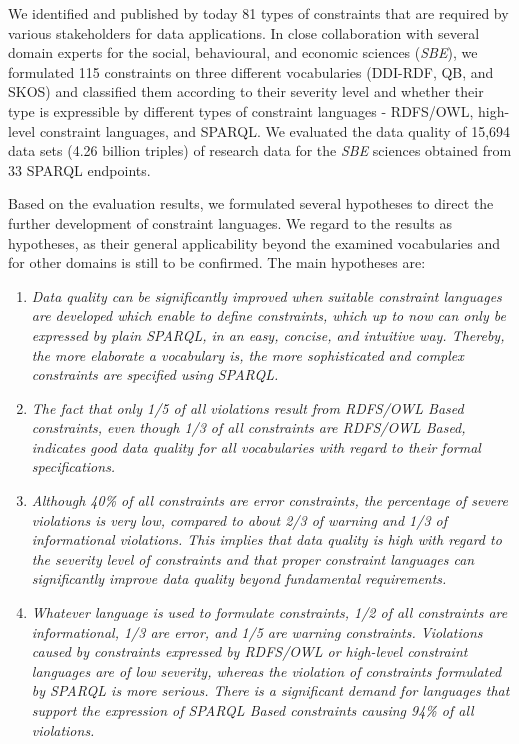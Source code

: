 \documentclass[conference]{IEEEtran}
\begin{document}
We identified and published by today 81 types of constraints  that are required by various stakeholders for data applications.
In close collaboration with several domain experts for the social, behavioural, and economic sciences (\emph{SBE}), we formulated 115 constraints on three different vocabularies (DDI-RDF, QB, and SKOS) and classified them according to their severity level and  whether their type is expressible by different types of constraint languages - RDFS/OWL, high-level constraint languages, and SPARQL. 
We evaluated  the data quality of 15,694 data sets (4.26 billion triples) of research data for the \emph{SBE} sciences obtained from 33 SPARQL endpoints.

Based on the evaluation results,
we formulated several hypotheses to direct the further development of constraint languages. We regard to the results as hypotheses, as their general applicability beyond the examined vocabularies and for other domains is still to be confirmed.
The main hypotheses are: 

\begin{enumerate}
\item
\emph{Data quality can be significantly improved when suitable constraint languages are developed which enable to define 
constraints, which up to now can only be expressed by plain SPARQL, in an easy, concise, and intuitive way. Thereby, the more elaborate a vocabulary is, the more sophisticated and complex constraints are specified using SPARQL.}
\item
\emph{The fact that only 1/5 of all violations result from RDFS/OWL Based constraints, even though 1/3 of all constraints are RDFS/OWL Based, indicates good data quality for all vocabularies with regard to their formal specifications.}  
\item
\emph{Although 40\% of all constraints are error constraints, the percentage of severe violations is very low, compared to about 2/3 of warning and 1/3 of informational violations. This implies that data quality is high with regard to the severity level of constraints and that proper constraint languages can significantly improve data quality beyond fundamental requirements.}
\item
\emph{Whatever language is used to formulate constraints, 1/2 of all constraints are informational, 1/3 are error, and 1/5 are warning constraints. 
Violations caused by constraints expressed by RDFS/OWL or high-level constraint languages are of low severity, whereas the violation of constraints formulated by SPARQL is more serious.
There is a significant demand for languages that support the expression of SPARQL Based constraints causing 94\% of all violations.}
\end{enumerate}
\end{document}
